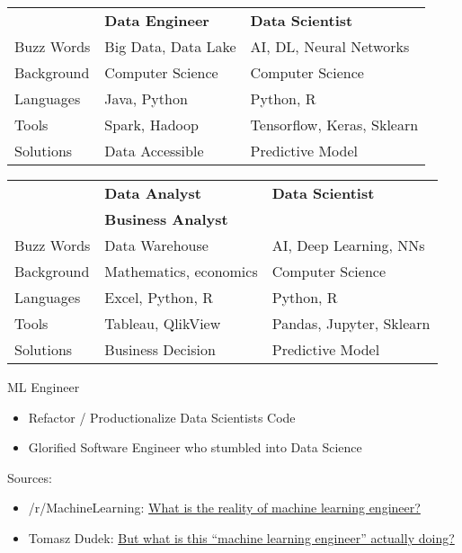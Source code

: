 \documentclass{beamer}
\begin{document}
\begin{frame}[plain]{}
    \begin{tabular}{l|ll}
                & \textbf{Data Engineer} & \textbf{Data Scientist} \\
    Buzz Words  & Big Data, Data Lake    & AI, DL, Neural Networks \\
    Background  & Computer Science       & Computer Science        \\
    Languages   & Java, Python           & Python, R               \\
    Tools       & Spark, Hadoop          & Tensorflow, Keras, Sklearn \\
    Solutions   & Data Accessible        & Predictive Model        \\
    \end{tabular}
\end{frame}

\begin{frame}[plain]{}
    \begin{tabular}{l|ll}
                & \textbf{Data Analyst}     & \textbf{Data Scientist} \\
                & \textbf{Business Analyst} &       \\
    Buzz Words  & Data Warehouse            & AI, Deep Learning, NNs \\
    Background  & Mathematics, economics    & Computer Science \\
    Languages   & Excel, Python, R          & Python, R           \\
    Tools       & Tableau, QlikView         & Pandas, Jupyter, Sklearn \\
    Solutions   & Business Decision         & Predictive Model        \\
    \end{tabular}
\end{frame}

\begin{frame}[plain]{}
    \begin{center}
        \huge ML Engineer
        \normalsize
        \begin{itemize}
            \item Refactor / Productionalize Data Scientists Code
            \item Glorified Software Engineer who stumbled into Data Science
        \end{itemize}
        \tiny
        Sources: 

        \begin{itemize}
            \item /r/MachineLearning: \href{https://www.reddit.com/r/MachineLearning/comments/cxhvbd/}{What is the reality of machine learning engineer?}
            \item Tomasz Dudek: \href{https://medium.com/@tomaszdudek/but-what-is-this-machine-learning-engineer-actually-doing-18464d5c699}{But what is this “machine learning engineer” actually doing?}
        \end{itemize}
    \end{center}
\end{frame}
\end{document}
